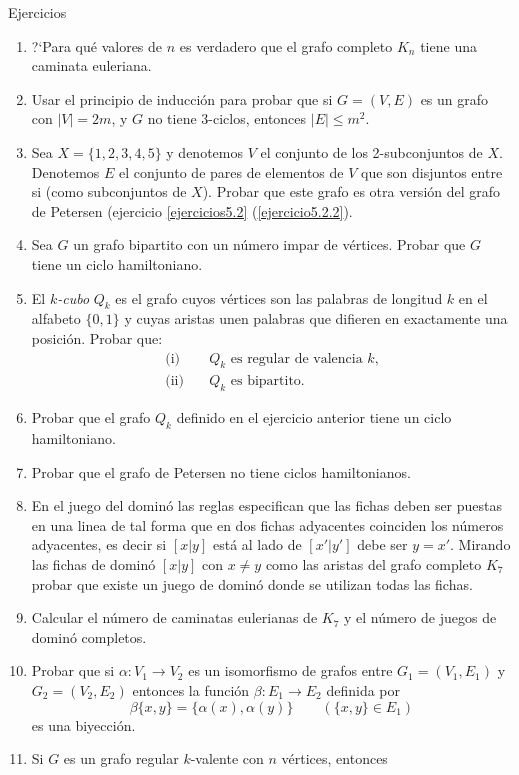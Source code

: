 \documentclass[11pt,spanish,makeidx]{amsbook}
\theoremstyle{definition}
\theoremstyle{remark}
\begin{document}
\begin{section}{Ejercicios}
\begin{enumerate}
\item ?`Para qué valores de $n$ es verdadero que el grafo completo $K_n$ tiene una caminata euleriana.
\item Usar el principio de inducción para probar que si $G=(V,E)$ es un grafo con $|V|=2m$, y $G$ no tiene 3-ciclos, entonces $|E|\le m^2$.
\item Sea $X=\{1,2,3,4,5\}$ y denotemos $V$ el conjunto de los 2-subconjuntos de $X$. Denotemos $E$ el conjunto de pares de elementos de $V$ que son disjuntos entre si (como subconjuntos de $X$). Probar que este grafo es otra versión del grafo de Petersen (ejercicio \ref{ejercicios5.2} (\ref{ejercicio5.2.2}).
\item Sea $G$ un grafo bipartito con un número impar de vértices. Probar que $G$ tiene un ciclo hamiltoniano.
\item El {\em $k$-cubo} $Q_k$ es el grafo cuyos vértices son las palabras de longitud $k$ en el alfabeto $\{0,1\}$ y cuyas aristas unen palabras que difieren en exactamente una posición. Probar que:
$$
\begin{aligned}
\text{(i)} \quad &\text{$Q_k$ es regular de valencia $k$,}\\
\text{(ii)} \quad &\text{$Q_k$ es bipartito.}
\end{aligned}
$$
\item Probar que el grafo $Q_k$ definido en el ejercicio anterior tiene un ciclo hamiltoniano.
\item Probar que el grafo de Petersen no tiene ciclos hamiltonianos.
\item En el juego del dominó las reglas especifican que las fichas deben ser puestas en una linea de tal forma que en dos fichas adyacentes coinciden los números adyacentes, es decir si $[x|y]$ está al lado de $[x'|y']$ debe ser $y=x'$. Mirando las fichas de dominó $[x|y]$ con $x\not=y$ como las aristas del grafo completo $K_7$ probar que existe un juego de dominó donde se utilizan todas las fichas.
\item Calcular el número de caminatas eulerianas de $K_7$ y el número de juegos de dominó completos. 
\item Probar que si $\alpha: V_1 \to  V_2$ es un isomorfismo de grafos entre $G_1=(V_1,E_1)$ y  $G_2=(V_2,E_2)$ entonces la función $\beta:E_1 \to  E_2$ definida por
$$
\beta\{x,y\} = \{\alpha(x),\alpha(y)\} \qquad (\{x,y\} \in E_1)
$$
es una biyección.
\item Si $G$ es un grafo regular $k$-valente con $n$ vértices, entonces

\end{enumerate}
\end{section}
\end{document}
